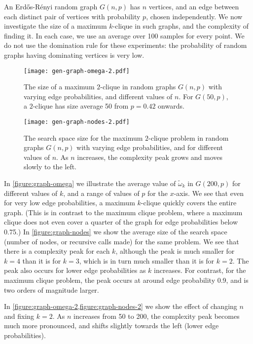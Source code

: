 \documentclass[letterpaper]{article}
\begin{document}
An Erd\H{o}s-R\'{e}nyi random graph $G(n, p)$ has $n$ vertices, and an edge between each distinct
pair of vertices with probability $p$, chosen independently. We now investigate the size of a
maximum $k$-clique in such graphs, and the complexity of finding it. In each case, we use an average
over 100 samples for every point.  We do not use the domination rule for these experiments: the
probability of random graphs having dominating vertices is very low.

\begin{figure}[h!] %
    \centering
    \texttt{[image: gen-graph-omega-2.pdf]}
    \caption{The size of a maximum $2$-clique in random graphs $G(n, p)$ with varying edge
        probabilities, and different values of $n$. For $G(50, p)$, a $2$-clique has size average 50
    from $p = 0.42$ onwards.}
    \label{figure:graph-omega-2}
\end{figure}

\begin{figure}[h!] %
    \centering
    \texttt{[image: gen-graph-nodes-2.pdf]}
    \caption{The search space size for the maximum $2$-clique problem in random graphs $G(n, p)$
        with varying edge probabilities, and for different values of $n$. As $n$ increases, the
    complexity peak grows and moves slowly to the left.}
    \label{figure:graph-nodes-2}
\end{figure}

In \cref{figure:graph-omega} we illustrate the average value of $\tilde{\omega}_k$ in $G(200,
p)$ for different values of $k$, and a range of values of $p$ for the $x$-axis. We see that even for
very low edge probabilities, a maximum $k$-clique quickly covers the entire graph.  (This is in contrast to
the maximum clique problem, where a maximum clique does not even cover a quarter of the graph for
edge probabilities below 0.75.) In \cref{figure:graph-nodes} we show the average size of the
search space (number of nodes, or recursive calls made) for the same problem. We see that there is a
complexity peak for each $k$, although the peak is much smaller for $k = 4$ than it is for $k = 3$,
which is in turn much smaller than it is for $k = 2$. The peak also occurs for lower edge
probabilities as $k$ increases. For contrast, for the maximum clique problem, the peak occurs at
around edge probability 0.9, and is two orders of magnitude larger.

In \cref{figure:graph-omega-2,figure:graph-nodes-2} we show the effect of
changing $n$ and fixing $k = 2$. As $n$ increases from 50 to 200, the complexity peak becomes much
more pronounced, and shifts slightly towards the left (lower edge probabilities).
\end{document}
